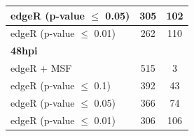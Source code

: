 \documentclass[10pt,a4paper,twocolumn]{article}
\begin{document}
\begin{table}[]
\begin{tabular}{lll}
		\multicolumn{1}{|l|}{edgeR (p-value $\leq$ 0.05)} & \multicolumn{1}{c|}{305}                                             & \multicolumn{1}{c|}{102}              \\ \hline
		\multicolumn{1}{|l|}{edgeR (p-value $\leq$ 0.01)} & \multicolumn{1}{c|}{262}                                             & \multicolumn{1}{c|}{110}              \\ \hline
		\multicolumn{1}{|l|}{\textbf{48hpi}}              & \multicolumn{1}{c|}{}                                                & \multicolumn{1}{c|}{}                 \\ \hline
		\multicolumn{1}{|l|}{edgeR + MSF}                 & \multicolumn{1}{c|}{515}                                             & \multicolumn{1}{c|}{3}                \\ \hline
		\multicolumn{1}{|l|}{edgeR (p-value $\leq$ 0.1)}  & \multicolumn{1}{c|}{392}                                             & \multicolumn{1}{c|}{43}               \\ \hline
		\multicolumn{1}{|l|}{edgeR (p-value $\leq$ 0.05)} & \multicolumn{1}{c|}{366}                                             & \multicolumn{1}{c|}{74}               \\ \hline
		\multicolumn{1}{|l|}{edgeR (p-value $\leq$ 0.01)} & \multicolumn{1}{c|}{306}                                             & \multicolumn{1}{c|}{106}               \\ \hline
	\end{tabular}
\end{table}
\end{document}

